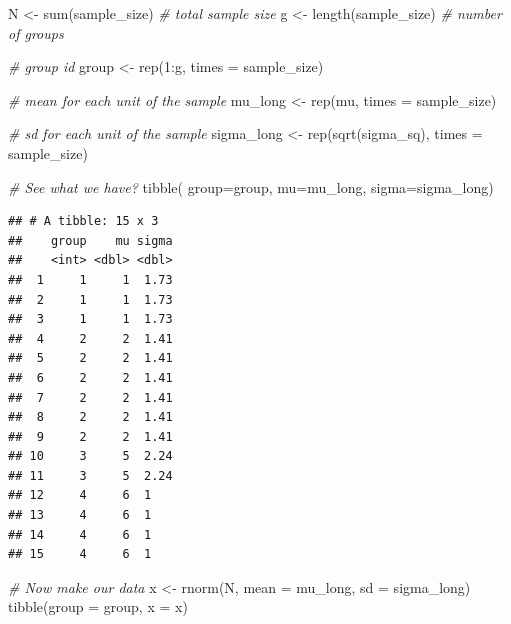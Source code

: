 \documentclass[
]{book}
\newenvironment{Shaded}{\begin{snugshade}}{\end{snugshade}}
\newcommand{\AttributeTok}[1]{\textcolor[rgb]{0.77,0.63,0.00}{#1}}
\newcommand{\CommentTok}[1]{\textcolor[rgb]{0.56,0.35,0.01}{\textit{#1}}}
\newcommand{\DecValTok}[1]{\textcolor[rgb]{0.00,0.00,0.81}{#1}}
\newcommand{\FunctionTok}[1]{\textcolor[rgb]{0.00,0.00,0.00}{#1}}
\newcommand{\NormalTok}[1]{#1}
\newcommand{\OtherTok}[1]{\textcolor[rgb]{0.56,0.35,0.01}{#1}}
\newcommand{\SpecialCharTok}[1]{\textcolor[rgb]{0.00,0.00,0.00}{#1}}
\begin{document}
\begin{Shaded}
\begin{Highlighting}[]
\NormalTok{N }\OtherTok{\textless{}{-}} \FunctionTok{sum}\NormalTok{(sample\_size) }\CommentTok{\# total sample size}
\NormalTok{g }\OtherTok{\textless{}{-}} \FunctionTok{length}\NormalTok{(sample\_size) }\CommentTok{\# number of groups}

\CommentTok{\# group id}
\NormalTok{group }\OtherTok{\textless{}{-}} \FunctionTok{rep}\NormalTok{(}\DecValTok{1}\SpecialCharTok{:}\NormalTok{g, }\AttributeTok{times =}\NormalTok{ sample\_size)}

\CommentTok{\# mean for each unit of the sample}
\NormalTok{mu\_long }\OtherTok{\textless{}{-}} \FunctionTok{rep}\NormalTok{(mu, }\AttributeTok{times =}\NormalTok{ sample\_size) }

\CommentTok{\# sd for each unit of the sample}
\NormalTok{sigma\_long }\OtherTok{\textless{}{-}} \FunctionTok{rep}\NormalTok{(}\FunctionTok{sqrt}\NormalTok{(sigma\_sq), }\AttributeTok{times =}\NormalTok{ sample\_size) }

\CommentTok{\# See what we have?}
\FunctionTok{tibble}\NormalTok{( }\AttributeTok{group=}\NormalTok{group, }\AttributeTok{mu=}\NormalTok{mu\_long, }\AttributeTok{sigma=}\NormalTok{sigma\_long)}
\end{Highlighting}
\end{Shaded}

\begin{verbatim}
## # A tibble: 15 x 3
##    group    mu sigma
##    <int> <dbl> <dbl>
##  1     1     1  1.73
##  2     1     1  1.73
##  3     1     1  1.73
##  4     2     2  1.41
##  5     2     2  1.41
##  6     2     2  1.41
##  7     2     2  1.41
##  8     2     2  1.41
##  9     2     2  1.41
## 10     3     5  2.24
## 11     3     5  2.24
## 12     4     6  1   
## 13     4     6  1   
## 14     4     6  1   
## 15     4     6  1
\end{verbatim}

\begin{Shaded}
\begin{Highlighting}[]
\CommentTok{\# Now make our data}
\NormalTok{x }\OtherTok{\textless{}{-}} \FunctionTok{rnorm}\NormalTok{(N, }\AttributeTok{mean =}\NormalTok{ mu\_long, }\AttributeTok{sd =}\NormalTok{ sigma\_long)}
\FunctionTok{tibble}\NormalTok{(}\AttributeTok{group =}\NormalTok{ group, }\AttributeTok{x =}\NormalTok{ x)}
\end{Highlighting}
\end{Shaded}
\end{document}
